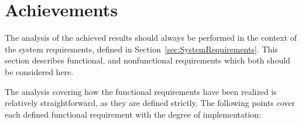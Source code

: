 

%


\section{Achievements}

\label{sec:achievements}

The analysis of the achieved results should always be performed in the context of the system requirements, defined in Section~\ref{sec:SystemRequirements}. This section describes functional, and nonfunctional requirements which both should be considered here.

The analysis covering how the functional requirements have been realized is relatively straightforward, as they are defined strictly. The following points cover each defined functional requirement with the degree of implementation:

